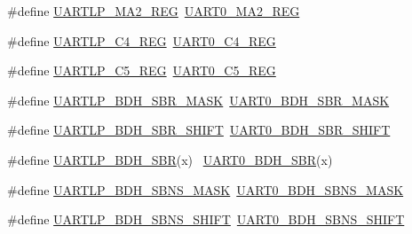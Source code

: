 \begin{DoxyCompactItemize}
\#define \hyperlink{group___backward___compatibility___symbols_ga88eb460f480938f175efb58b54db515c}{U\+A\+R\+T\+L\+P\+\_\+\+M\+A2\+\_\+\+R\+EG}~\hyperlink{group___u_a_r_t0___register___accessor___macros_ga3e06e7b1da53413767f86e8e5aae8900}{U\+A\+R\+T0\+\_\+\+M\+A2\+\_\+\+R\+EG}
\item 
\#define \hyperlink{group___backward___compatibility___symbols_gaf72e56d7ea7d8a9c232d8ec3660b7451}{U\+A\+R\+T\+L\+P\+\_\+\+C4\+\_\+\+R\+EG}~\hyperlink{group___u_a_r_t0___register___accessor___macros_gabc4a3f220e1d978c3fcca2b38a1fc599}{U\+A\+R\+T0\+\_\+\+C4\+\_\+\+R\+EG}
\item 
\#define \hyperlink{group___backward___compatibility___symbols_gabc0ed230faba55a9874ca37a592326b3}{U\+A\+R\+T\+L\+P\+\_\+\+C5\+\_\+\+R\+EG}~\hyperlink{group___u_a_r_t0___register___accessor___macros_ga852f349be956e4aa40d470695a17b7c0}{U\+A\+R\+T0\+\_\+\+C5\+\_\+\+R\+EG}
\item 
\#define \hyperlink{group___backward___compatibility___symbols_ga0654a0aae3440ab5346eb9ecc4bd86d6}{U\+A\+R\+T\+L\+P\+\_\+\+B\+D\+H\+\_\+\+S\+B\+R\+\_\+\+M\+A\+SK}~\hyperlink{group___u_a_r_t0___register___masks_ga594b77e6abc9054650d85c9d7e2c4cfa}{U\+A\+R\+T0\+\_\+\+B\+D\+H\+\_\+\+S\+B\+R\+\_\+\+M\+A\+SK}
\item 
\#define \hyperlink{group___backward___compatibility___symbols_ga564ff56e5370588f01e2bc1a4e14d191}{U\+A\+R\+T\+L\+P\+\_\+\+B\+D\+H\+\_\+\+S\+B\+R\+\_\+\+S\+H\+I\+FT}~\hyperlink{group___u_a_r_t0___register___masks_ga5262e2ab11a18782a8cceb9a63affe27}{U\+A\+R\+T0\+\_\+\+B\+D\+H\+\_\+\+S\+B\+R\+\_\+\+S\+H\+I\+FT}
\item 
\#define \hyperlink{group___backward___compatibility___symbols_ga0889ff385f4379ab9f34e1de3e5c72e1}{U\+A\+R\+T\+L\+P\+\_\+\+B\+D\+H\+\_\+\+S\+BR}(x)                                            ~\hyperlink{group___u_a_r_t0___register___masks_ga942863cb4a3cc74988807d489e7fb4c8}{U\+A\+R\+T0\+\_\+\+B\+D\+H\+\_\+\+S\+BR}(x)
\item 
\#define \hyperlink{group___backward___compatibility___symbols_ga6fee92bf869c5fe7376bd4aca728d4bc}{U\+A\+R\+T\+L\+P\+\_\+\+B\+D\+H\+\_\+\+S\+B\+N\+S\+\_\+\+M\+A\+SK}~\hyperlink{group___u_a_r_t0___register___masks_gaed905f161d823efa3beca3e0e93d39ff}{U\+A\+R\+T0\+\_\+\+B\+D\+H\+\_\+\+S\+B\+N\+S\+\_\+\+M\+A\+SK}
\item 
\#define \hyperlink{group___backward___compatibility___symbols_gaaff5e47bbe5fd72ca58ec73c448a1962}{U\+A\+R\+T\+L\+P\+\_\+\+B\+D\+H\+\_\+\+S\+B\+N\+S\+\_\+\+S\+H\+I\+FT}~\hyperlink{group___u_a_r_t0___register___masks_gad8909b0c50ce1d7436a2bdb2d99cce1a}{U\+A\+R\+T0\+\_\+\+B\+D\+H\+\_\+\+S\+B\+N\+S\+\_\+\+S\+H\+I\+FT}

\end{DoxyCompactItemize}

